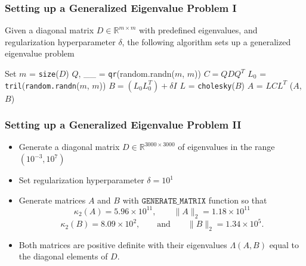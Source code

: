 \documentclass[landscape]{beamer}
\newcommand{\eqand}{\qquad\mbox{and}\qquad}
\begin{document}
\begin{frame}
	\frametitle{Setting up a Generalized Eigenvalue Problem I}
	Given a diagonal matrix $D \in \mathbb{R}^{m \times m}$ with predefined eigenvalues, and regularization hyperparameter $\delta$, the following algorithm sets up a generalized eigenvalue problem
		\begin{algorithmic}[1]
		\State Set $m$ = \texttt{size}($D$)
		\State $Q$, \_\_ = \texttt{qr}(random.randn($m$, $m$))
		\State $C = QDQ^T$
		\State $L_{0}$ = \texttt{tril}(\texttt{random.randn}($m$, $m$))
		\State $B = (L_0 L_0^T) + \delta I$
		\State $L$ = \texttt{cholesky}($B$)
		\State $A$ = $LCL^T$
		\State \Return ($A$, $B$)
		\EndFunction
	\end{algorithmic}
\end{frame}

\begin{frame}
  \frametitle{Setting up a Generalized Eigenvalue Problem II}
  \begin{itemize}
  \item Generate a diagonal matrix $D \in \mathbb{R}^{3000 \times 3000}$ of eigenvalues in the range $(10^{-3}, 10^7)$
  \item Set regularization hyperparameter $\delta = 10^1$
  \item Generate matrices $A$ and $B$ with $\texttt{GENERATE\_MATRIX}$ function so that 
    \begin{equation*}
      \kappa_2(A) = 5.96\times 10^{11}, \qquad \|A\|_2 = 1.18\times 10^{11}
    \end{equation*}
    \begin{equation*}
      \kappa_2(B) = 8.09\times 10^{2}, \eqand \|B\|_2 = 1.34 \times 10^{5}.
    \end{equation*}
   \item Both matrices are positive definite with their eigenvalues $\Lambda(A, B)$ equal to the diagonal elements of $D$.
  \end{itemize}
\end{frame}
\end{document}
